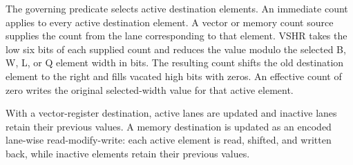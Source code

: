 The governing predicate selects active destination elements. An immediate
count applies to every active destination element. A vector or
memory count source supplies the count from the lane corresponding to that
element. VSHR takes the low six bits of each supplied count and reduces the
value modulo the selected B, W, L, or Q element width in bits. The resulting
count shifts the old destination element to the right and fills vacated high
bits with zeros. An effective count of zero writes the original selected-width
value for that active element.

With a vector-register destination, active lanes are updated and inactive lanes
retain their previous values. A memory destination is updated as an encoded
lane-wise read-modify-write: each active element is read, shifted, and written
back, while inactive elements retain their previous values.
